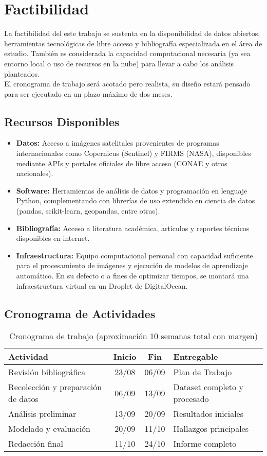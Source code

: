 \section{Factibilidad}
La factibilidad del este trabajo se sustenta en la disponibilidad de datos abiertos, herramientas tecnológicas de libre acceso y bibliografía especializada en el área de estudio. También es considerada la capacidad computacional necesaria (ya sea entorno local o uso de recursos en la nube) para llevar a cabo los análisis planteados. \\

El cronograma de trabajo será acotado pero realista, su diseño estará pensado para ser ejecutado en un plazo máximo de dos meses.

\subsection{Recursos Disponibles}
\begin{itemize}
    \item \textbf{Datos:} Acceso a imágenes satelitales provenientes de programas internacionales como Copernicus (Sentinel) y FIRMS (NASA), disponibles mediante APIs y portales oficiales de libre acceso (CONAE y otros nacionales).
    \item \textbf{Software:} Herramientas de análisis de datos y programación en lenguaje Python, complementando con librerías de uso extendido en ciencia de datos (pandas, scikit-learn, geopandas, entre otras).
    \item \textbf{Bibliografía:} Acceso a literatura académica, artículos y reportes técnicos disponibles en internet.
    \item \textbf{Infraestructura:} Equipo computacional personal con capacidad suficiente para el procesamiento de imágenes y ejecución de modelos de aprendizaje automático. En su defecto o a fines de optimizar tiempos, se montará una infraestructura virtual en un Droplet de DigitalOcean.
\end{itemize}

\subsection{Cronograma de Actividades}
\begin{table}[h]
\centering
\begin{tabular}{lccl}
\toprule
\textbf{Actividad} & \textbf{Inicio} & \textbf{Fin} & \textbf{Entregable} \\
\midrule
Revisión bibliográfica & 23/08 & 06/09 & Plan de Trabajo \\
Recolección y preparación de datos & 06/09 & 13/09 & Dataset completo y procesado \\
Análisis preliminar & 13/09 & 20/09 & Resultados iniciales \\
Modelado y evaluación & 20/09 & 11/10 & Hallazgos principales \\
Redacción final & 11/10 & 24/10 & Informe completo \\
\bottomrule
\end{tabular}
\caption{Cronograma de trabajo (aproximación 10 semanas total con margen)}
\end{table}

